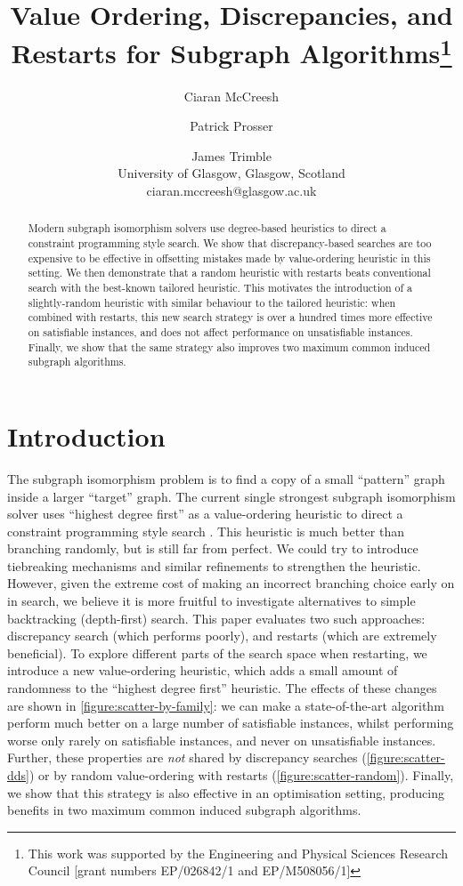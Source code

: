 \documentclass{article}
\title{Value Ordering, Discrepancies, and Restarts for Subgraph Algorithms\thanks{This work was
supported by the Engineering and Physical Sciences Research Council [grant numbers EP/026842/1 and EP/M508056/1]}}
\author{Ciaran McCreesh \and Patrick Prosser \and James Trimble\\ University of Glasgow, Glasgow, Scotland \\
    ciaran.mccreesh@glasgow.ac.uk}
\newcommand{\citep}[1]{\cite{#1}}
\begin{document}
\maketitle

\begin{abstract}
    Modern subgraph isomorphism solvers use degree-based heuristics to direct a constraint
    programming style search. We show that discrepancy-based searches are too expensive to be
    effective in offsetting mistakes made by value-ordering heuristic in this setting.  We then
    demonstrate that a random heuristic with restarts beats conventional search with the best-known
    tailored heuristic. This motivates the introduction of a slightly-random heuristic with similar
    behaviour to the tailored heuristic: when combined with restarts, this new search strategy is
    over a hundred times more effective on satisfiable instances, and does not affect performance on
    unsatisfiable instances. Finally, we show that the same strategy also improves two maximum
    common induced subgraph algorithms.
\end{abstract}

\section{Introduction}

The subgraph isomorphism problem is to find a copy of a small ``pattern'' graph inside a larger
``target'' graph.  The current single strongest subgraph isomorphism solver uses ``highest degree
first'' as a value-ordering heuristic to direct a constraint programming style search
\citep{DBLP:conf/cp/McCreeshP15,DBLP:conf/lion/KotthoffMS16,DBLP:conf/ijcai/McCreeshPT16}. This
heuristic is much better than branching randomly, but is still far from perfect.  We could try to
introduce tiebreaking mechanisms and similar refinements to strengthen the heuristic. However, given
the extreme cost of making an incorrect branching choice early on in search, we believe it is more
fruitful to investigate alternatives to simple backtracking (depth-first) search. This paper
evaluates two such approaches: discrepancy search (which performs poorly), and restarts (which are
extremely beneficial). To explore different parts of the search space when restarting, we introduce
a new value-ordering heuristic, which adds a small amount of randomness to the ``highest degree
first'' heuristic.  The effects of these changes are shown in
\cref{figure:scatter-by-family}: we can make a state-of-the-art algorithm perform much better on a
large number of satisfiable instances, whilst performing worse only rarely on satisfiable instances,
and never on unsatisfiable instances.  Further, these properties are \emph{not} shared by
discrepancy searches (\cref{figure:scatter-dds}) or by random value-ordering with restarts
(\cref{figure:scatter-random}). Finally, we show that this strategy is also effective in an
optimisation setting, producing benefits in two maximum common induced subgraph algorithms.
\end{document}

